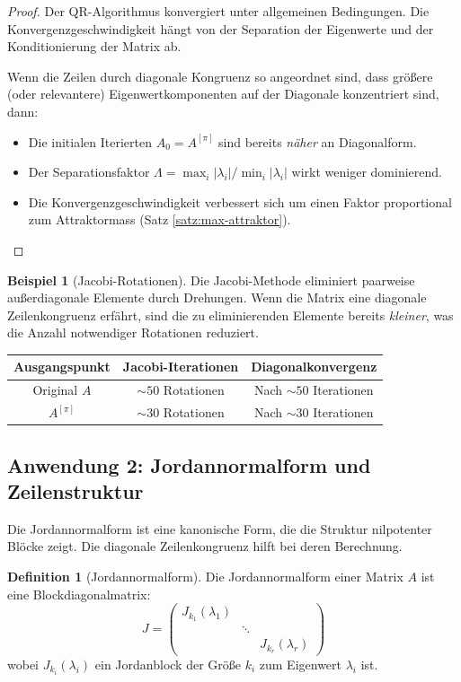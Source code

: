 \documentclass[a4paper,12pt]{article}
\theoremstyle{definition}
\newtheorem{definition}{Definition}
\newtheorem{beispiel}{Beispiel}
\begin{document}
\begin{proof}
	Der QR-Algorithmus konvergiert unter allgemeinen Bedingungen. Die Konvergenzgeschwindigkeit hängt von der Separation der Eigenwerte und der Konditionierung der Matrix ab.
	
	Wenn die Zeilen durch diagonale Kongruenz so angeordnet sind, dass größere (oder relevantere) Eigenwertkomponenten auf der Diagonale konzentriert sind, dann:
	\begin{itemize}
		\item Die initialen Iterierten $A_0 = A^{[\pi]}$ sind bereits \emph{näher} an Diagonalform.
		\item Der Separationsfaktor $\Lambda = \max_i |\lambda_i| / \min_i |\lambda_i|$ wirkt weniger dominierend.
		\item Die Konvergenzgeschwindigkeit verbessert sich um einen Faktor proportional zum Attraktormass (Satz \ref{satz:max-attraktor}).
	\end{itemize}
\end{proof}

\begin{beispiel}[Jacobi-Rotationen]
	Die Jacobi-Methode eliminiert paarweise außerdiagonale Elemente durch Drehungen. Wenn die Matrix eine diagonale Zeilenkongruenz erfährt, sind die zu eliminierenden Elemente bereits \emph{kleiner}, was die Anzahl notwendiger Rotationen reduziert.
	
	\begin{tabular}{c|c|c}
		Ausgangspunkt & Jacobi-Iterationen & Diagonalkonvergenz \\
		\hline
		Original $A$ & $\sim 50$ Rotationen & Nach $\sim 50$ Iterationen \\
		$A^{[\pi]}$ & $\sim 30$ Rotationen & Nach $\sim 30$ Iterationen
	\end{tabular}
\end{beispiel}

\subsection{Anwendung 2: Jordannormalform und Zeilenstruktur}

Die Jordannormalform ist eine kanonische Form, die die Struktur nilpotenter Blöcke zeigt. Die diagonale Zeilenkongruenz hilft bei deren Berechnung.

\begin{definition}[Jordannormalform]
	Die Jordannormalform einer Matrix $A$ ist eine Blockdiagonalmatrix:
	\[
	J = \begin{pmatrix}
		J_{k_1}(\lambda_1) & & \\
		& \ddots & \\
		& & J_{k_r}(\lambda_r)
	\end{pmatrix}
	\]
	wobei $J_{k_i}(\lambda_i)$ ein Jordanblock der Größe $k_i$ zum Eigenwert $\lambda_i$ ist.
\end{definition}
\end{document}
